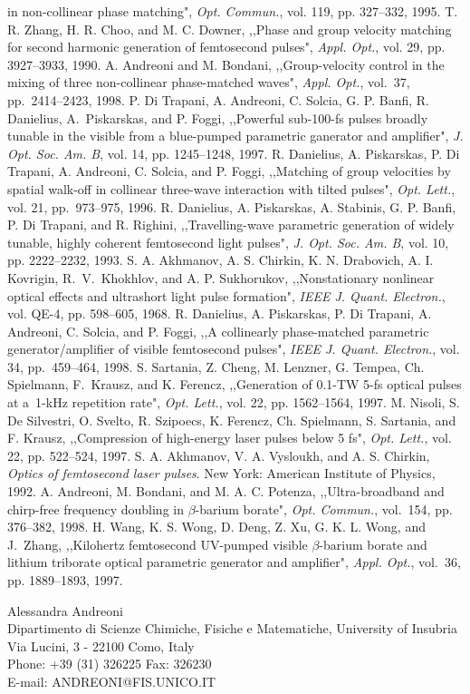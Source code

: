 \documentclass[times]{jtitauth}
\begin{document}
\begin{thebibliography}{99}
in non-collinear phase matching", {\it Opt. Commun.}, vol. 119,
pp. 327--332, 1995.
T. R. Zhang, H. R. Choo, and M. C. Downer, ,,Phase and group
velocity matching for second harmonic generation of femtosecond
pulses", {\it Appl. Opt.}, vol. 29, pp. 3927--3933, 1990.
A. Andreoni and M. Bondani, ,,Group-velocity control in the
\mbox{mixing} of three non-collinear phase-matched waves", {\it
Appl. Opt.}, vol.~37, \mbox{pp.~2414--2423,} 1998.
P. Di Trapani, A. Andreoni, C. Solcia, G. P. Banfi, R.
Danielius, A.~Piskarskas, and P. Foggi, ,,Powerful sub-100-fs
pulses broadly tunable in the visible from a blue-pumped
parametric ganerator and amplifier", {\it J. Opt. Soc. Am. B},
vol. 14, pp. 1245--1248, 1997.
R. Danielius, A. Piskarskas, P. Di Trapani, A. Andreoni,
C. Solcia, and P. Foggi, ,,Matching of group velocities by spatial
walk-off in collinear three-wave interaction with tilted pulses",
{\it Opt. Lett.}, vol. 21, \mbox{pp.~973--975,} 1996.
R. Danielius, A. Piskarskas, A. Stabinis, G. P. Banfi, P.
Di Trapani, and R. Righini, ,,Travelling-wave parametric
generation of widely tunable, highly coherent femtosecond light
pulses", {\it J. Opt. Soc. Am. B}, vol. 10, pp. 2222--2232, 1993.
S. A. Akhmanov, A. S. Chirkin, K. N. Drabovich, A. I.
Kovrigin, R.~V.~Khokhlov, and A. P. Sukhorukov, ,,Nonstationary
nonlinear optical effects and ultrashort light pulse formation",
{\it IEEE J. Quant. Ele\-ctron.}, vol. QE-4, pp. 598--605, 1968.
R. Danielius, A. Piskarskas, P. Di Trapani, A. Andreoni,
C. Solcia, and P. Foggi, ,,A collinearly phase-matched parametric
generator/amplifier of visible femtosecond pulses", {\it IEEE J.
Quant. Electron.}, vol. 34, \mbox{pp.~459--464,} 1998.
S. Sartania, Z. Cheng, M. Lenzner, G. Tempea, Ch.
Spielmann, F.~Krausz, and K. Ferencz, ,,Generation of 0.1-TW 5-fs
optical pulses at a~1-kHz repetition rate", {\it Opt. Lett.}, vol.
22, pp. 1562--1564, 1997.
M. Nisoli, S. De Silvestri, O. Svelto, R. Szipoecs, K.
Ferencz, Ch. Spielmann, S. Sartania, and F. Krausz, ,,Compression
of high-energy laser pulses below 5 fs", {\it Opt. Lett.}, vol.
22, pp. 522--524, 1997.
S. A. Akhmanov, V. A. Vysloukh, and A. S. Chirkin, {\it Optics of femtose\-cond laser
pulses}. New York: American Institute of Physics, 1992.
A. Andreoni, M. Bondani, and M. A. C. Potenza,
,,Ultra-broadband and chirp-free frequency doubling in
$\beta$-barium borate", {\it Opt. Commun.}, vol.~154, pp.
376--382, 1998.
H. Wang, K. S. Wong, D. Deng, Z. Xu, G. K. L. Wong, and
J.~Zhang, ,,Kilohertz femtosecond UV-pumped visible $\beta$-barium
borate and lithium triborate optical parametric generator and
amplifier", {\it Appl. Opt.}, vol.~36, pp. 1889--1893, 1997.
\end{thebibliography}

\noindent Alessandra Andreoni \\ Dipartimento di Scienze Chimiche,
Fisiche e Matematiche, University of \mbox{Insubria} \\ Via
Lucini, 3 - 22100 Como, Italy \\ Phone: +39 (31) 326225    Fax:
326230 \\ E-mail: ANDREONI@FIS.UNICO.IT
\end{document}
